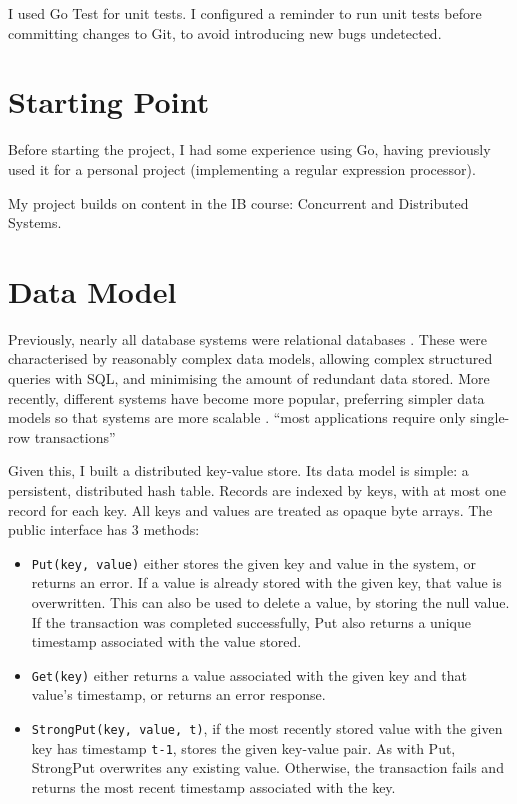 \documentclass[12pt,a4paper,twoside,openany]{report}
\begin{document}
I used Go Test for unit tests. I configured a reminder to run unit tests before committing changes to Git, to avoid introducing new bugs undetected.

\section{Starting Point}

Before starting the project, I had some experience using Go, having previously used it for a personal project (implementing a regular expression processor).

My project builds on content in the IB course: Concurrent and Distributed Systems.

\section{Data Model}

Previously, nearly all database systems were relational databases \cite{lake2013}. These were characterised by reasonably complex data models, allowing complex structured queries with SQL, and minimising the amount of redundant data stored. More recently, different systems have become more popular, preferring simpler data models so that systems are more scalable \cite{bailis2013highly}. ``most applications require only single-row transactions'' \cite{chang2008bigtable}

Given this, I built a distributed key-value store. Its data model is simple: a persistent, distributed hash table. Records are indexed by keys, with at most one record for each key. All keys and values are treated as opaque byte arrays. The public interface has 3 methods:

\begin{itemize}
\item
\verb|Put(key, value)| either stores the given key and value in the system, or returns an error. If a value is already stored with the given key, that value is overwritten. This can also be used to delete a value, by storing the null value. If the transaction was completed successfully, Put also returns a unique timestamp associated with the value stored.

\item
\verb|Get(key)| either returns a value associated with the given key and that value's timestamp, or returns an error response.

\item
\verb|StrongPut(key, value, t)|, if the most recently stored value with the given key has timestamp \verb|t-1|, stores the given key-value pair. As with Put, StrongPut overwrites any existing value. Otherwise, the transaction fails and returns the most recent timestamp associated with the key.

\end{itemize}
\end{document}
